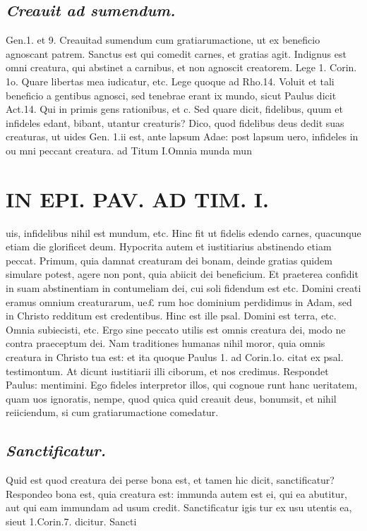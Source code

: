 \documentclass{article}
\begin{document}
\begin{pages}
\subsection*{\textit{Creauit ad sumendum. }}\pstart Gen.1. et 9. Creauitad sumendum cum gratiarumactione, ut ex beneficio agnoscant patrem. Sanctus est qui comedit carnes, et gratias agit. Indignus est omni creatura, qui abstinet a carnibus, et non agnoscit creatorem. Lege 1. Corin. 1o. Quare libertas mea iudicatur, etc. Lege quoque ad Rho.14. Voluit et tali beneficio a gentibus agnosci, sed tenebrae erant ix mundo, sicut Paulus dicit Act.14. Qui in primis gens rationibus, et c. Sed quare dicit, fidelibus, quum et infideles edant, bibant, utantur creaturis? Dico, quod fidelibus deus dedit suas creaturas, ut uides Gen. 1.ii est, ante lapsum Adae: post lapsum uero, infideles in ou mni peccant creatura. ad Titum I.Omnia munda mun  \pend
\section*{IN EPI. PAV. AD TIM. I. }
\marginpar{[ p.90 ]}\pstart uis, infidelibus nihil est mundum, etc. Hinc fit ut fidelis edendo carnes, quacunque etiam die glorificet deum. Hypocrita autem et iustitiarius abstinendo etiam peccat. Primum, quia damnat creaturam dei bonam, deinde gratias quidem simulare potest, agere non pont, quia abiicit dei beneficium. Et praeterea confidit in suam abstinentiam in contumeliam dei, cui soli fidendum est etc. Domini creati eramus omnium creaturarum, ue£ rum hoc dominium perdidimus in Adam, sed in Christo redditum est credentibus. Hinc est ille psal. Domini est terra, etc. Omnia subiecisti, etc. Ergo sine peccato utilis est omnis creatura dei, modo ne contra praeceptum dei. Nam traditiones humanas nihil moror, quia omnis creatura in Christo tua est: et ita quoque Paulus 1. ad Corin.1o. citat ex psal. testimontum. At dicunt iustitiarii illi ciborum, et nos credimus. Respondet Paulus: mentimini. Ego fideles interpretor illos, qui cognoue runt hanc ueritatem, quam uos ignoratis, nempe, quod quica quid creauit deus, bonumsit, et nihil reiiciendum, si cum gratiarumactione comedatur.  \pend
{}
{}
\subsection*{\textit{Sanctificatur. }}\pstart Quid est quod creatura dei perse bona est, et tamen hic dicit, sanctificatur? Respondeo bona est, quia creatura est: immunda autem est ei, qui ea abutitur, aut qui eam immundam ad usum credit. Sanctificatur igis tur ex usu utentis ea, sieut 1.Corin.7. dicitur. Sancti\pend

\end{pages}
\end{document}

